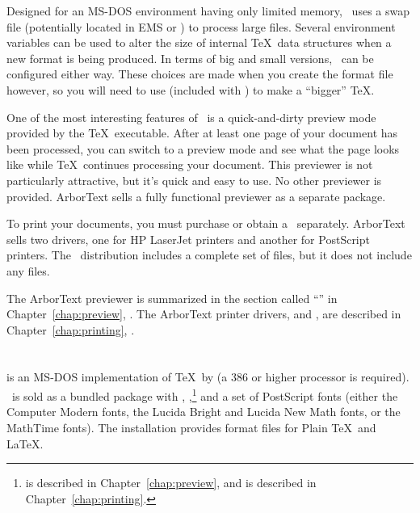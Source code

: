 Designed for an MS-DOS environment having only limited memory, \utex\ uses a
swap file (potentially located in EMS or )
to process large files.  Several environment variables can be used to alter
the size of internal \TeX\ data structures when a new format is being
produced.  In terms of big and small versions, \utex\ can be configured either
way.  These choices are made when you create the format file however, so you
will need to use  (included with \utex) to make a
``bigger'' \TeX.

One of the most interesting features of \utex\ is a quick-and-dirty preview
mode provided by the \TeX\ executable.  After at least one page of your
document has been processed, you can switch to a preview mode and see what the
page looks like while \TeX\ continues processing your document.  This
previewer is not particularly attractive, but it's quick and easy to use.  No
other previewer is provided.  ArborText sells a fully functional previewer as
a separate package.

To print your documents, you must purchase or obtain a \dvidriver\
separately.  ArborText sells two drivers, one for HP LaserJet printers and
another for PostScript printers.  The \utex\ distribution includes a complete
set of \ext{TFM} files, but it does not include any \ext{PK} files.

The ArborText previewer is summarized in the section called
``'' in Chapter~\ref{chap:preview}, {\it
\nameref{chap:preview}}.  The ArborText printer drivers,
 and
, are described in
Chapter~\ref{chap:printing}, {\it \nameref{chap:printing}\/}.

\section{\protect\yyTeX}

 is an MS-DOS implementation of \TeX\ by  
(a 386 or higher processor is required).  \yyTeX\ is
sold as a bundled package with
,
,\footnote{
is described in Chapter~\ref{chap:preview},
and  is described in Chapter~\ref{chap:printing}.} 
and a set of PostScript fonts (either the
Computer Modern fonts, the Lucida Bright and Lucida New Math fonts, or the
MathTime fonts).  The installation provides format files for Plain \TeX\ and
\LaTeX.

